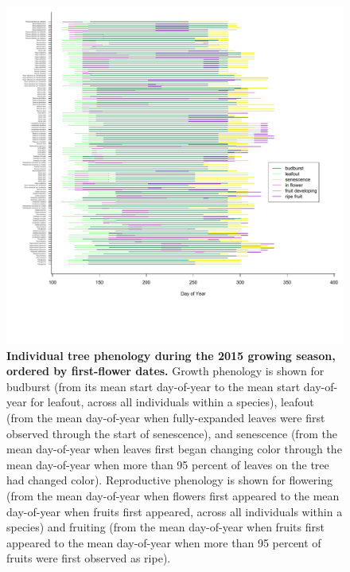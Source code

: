 \documentclass{article}
\begin{document}
\begin{figure}[h]
  \centering
  \includegraphics{../analyses/figures/grosea_repsort_ripefruit_ind_legend.pdf}
  \caption{\textbf{Individual tree phenology during the 2015 growing season, ordered by first-flower dates.} Growth phenology is shown for budburst (from its mean start day-of-year to the mean start day-of-year for leafout, across all individuals within a species), leafout (from the mean day-of-year when fully-expanded leaves were first observed through the start of senescence), and senescence (from the mean day-of-year when leaves first began changing color through the mean day-of-year when more than 95 percent of leaves on the tree had changed color). Reproductive phenology is shown for flowering (from the mean day-of-year when flowers first appeared to the mean day-of-year when fruits first appeared, across all individuals within a species) and fruiting (from the mean day-of-year when fruits first appeared to the mean day-of-year when more than 95 percent of fruits were first observed as ripe).}
 \label{fig:focind}
\end{figure}
  
\end{document}
